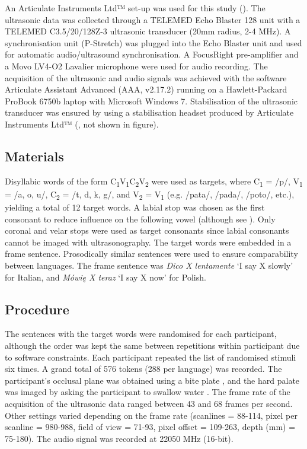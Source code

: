 \documentclass[authoryear, twocolumn]{elsarticle}
\begin{document}
An Articulate Instruments Ltd™ set-up was used for this study
(). The ultrasonic data was collected through a
TELEMED Echo Blaster 128 unit with a TELEMED C3.5/20/128Z-3 ultrasonic
transducer (20mm radius, 2-4 MHz). A synchronisation unit (P-Stretch)
was plugged into the Echo Blaster unit and used for automatic
audio/ultrasound synchronisation. A FocusRight pre-amplifier and a Movo
LV4-O2 Lavalier microphone were used for audio recording. The
acquisition of the ultrasonic and audio signals was achieved with the
software Articulate Assistant Advanced (AAA, v2.17.2) running on a
Hawlett-Packard ProBook 6750b laptop with Microsoft Windows 7.
Stabilisation of the ultrasonic transducer was ensured by using a
stabilisation headset produced by Articulate Instruments Ltd™
(\citealt{articulate2008}, not shown in figure).

\subsection{Materials}\label{materials}

Disyllabic words of the form
C\textsubscript{1}V\textsubscript{1}C\textsubscript{2}V\textsubscript{2}
were used as targets, where C\textsubscript{1} = /p/, V\textsubscript{1}
= /a, o, u/, C\textsubscript{2} = /t, d, k, g/, and V\textsubscript{2} =
V\textsubscript{1} (e.g. /pata/, /pada/, /poto/, etc.), yielding a total
of 12 target words. A labial stop was chosen as the first consonant to
reduce influence on the following vowel (although see
\citealt{vazquez-alvarez2007}). Only coronal and velar stops were used
as target consonants since labial consonants cannot be imaged with
ultrasonography. The target words were embedded in a frame sentence.
Prosodically similar sentences were used to ensure comparability between
languages. The frame sentence was \emph{Dico X lentamente} `I say X
slowly' for Italian, and \emph{Mówię X teraz} `I say X now' for Polish.

\subsection{Procedure}\label{procedure}

The sentences with the target words were randomised for each
participant, although the order was kept the same between repetitions
within participant due to software constraints. Each participant
repeated the list of randomised stimuli six times. A grand total of 576
tokens (288 per language) was recorded. The participant's occlusal plane
was obtained using a bite plate \citep{scobbie2011}, and the hard palate
was imaged by asking the participant to swallow water
\citep{epstein2005}. The frame rate of the acquisition of the ultrasonic
data ranged between 43 and 68 frames per second. Other settings varied
depending on the frame rate (scanlines = 88-114, pixel per scanline =
980-988, field of view = 71-93, pixel offset = 109-263, depth (mm) =
75-180). The audio signal was recorded at 22050 MHz (16-bit).
\end{document}
